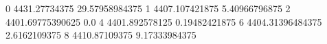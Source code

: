 0 4431.27734375 29.57958984375
1 4407.107421875 5.40966796875
2 4401.69775390625 0.0
4 4401.892578125 0.19482421875
6 4404.31396484375 2.6162109375
8 4410.87109375 9.17333984375
